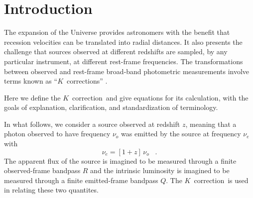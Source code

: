 \documentclass[preprint]{aastex}
\newcommand{\kcorrection}{$K$~correction}
\newcommand{\kcorrections}{{\kcorrection}s}
\newcommand{\nuobs}{\nu_o}
\newcommand{\nuemit}{\nu_e}
\begin{document}
\title{\scalebox{1.5}{The \kcorrection}}
\author{
  David W. Hogg,
  Ivan K. Baldry,
  Michael Blanton,
  and
  Daniel J. Eisenstein
}

\begin{abstract}
The \kcorrection\ ``corrects'' for the fact that sources observed at
different redshifts are, in general, compared with standards or each
other at different rest-frame wavelengths.  It is part of the relation
between the emitted- or rest-frame absolute magnitude of a source in
one broad photometric bandpass to the observed-frame apparent
magnitude of the same source in another broad bandpass.  This short
pedagogical paper provides definitions of and equations for the
\kcorrection.
\end{abstract}

\section{Introduction}

The expansion of the Universe provides astronomers with the benefit
that recession velocities can be translated into radial distances.  It
also presents the challenge that sources observed at different
redshifts are sampled, by any particular instrument, at different
rest-frame frequencies.  The transformations between observed and
rest-frame broad-band photometric measurements involve terms known as
``\kcorrections'' \citep*{humason56a, oke68a}.

Here we define the \kcorrection\ and give equations for its
calculation, with the goals of explanation, clarification, and
standardization of terminology.

In what follows, we consider a source observed at redshift $z$,
meaning that a photon observed to have frequency $\nuobs$ was emitted
by the source at frequency $\nuemit$ with
\begin{equation}
\nuemit = [1+z]\,\nuobs \;\;\;.
\end{equation}
The apparent flux of the source is imagined to be measured through a
finite observed-frame bandpass $R$ and the intrinsic luminosity is
imagined to be measured through a finite emitted-frame bandpass $Q$.
The \kcorrection\ is used in relating these two quantites.
\end{document}
